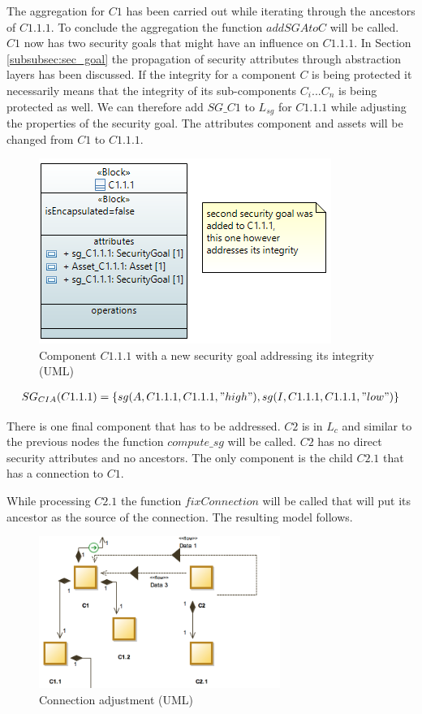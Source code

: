 The aggregation for $C1$ has been carried out while iterating through the ancestors of $C1.1.1$. To conclude the aggregation the function $addSGAtoC$ will be called. $C1$ now has two security goals that might have an influence on $C1.1.1$. In Section \ref{subsubsec:sec_goal} the propagation of security attributes through abstraction layers has been discussed. If the integrity for a component $C$ is being protected it necessarily means that the integrity of its sub-components $C_i ... C_n$ is being protected as well. We can therefore add $SG\_C1$ to $L_{sg}$ for $C1.1.1$ while adjusting the properties of the security goal. The attributes component and assets will be changed from $C1$ to $C1.1.1$.

\begin{figure}[H]
\centering
        \includegraphics[scale=0.9]{pictures/block_c111_integrity}
    \caption{Component $C1.1.1$ with a new security goal addressing its integrity (UML)}
\end{figure}

\begin{align*}
SG_{CIA}(C1.1.1) = \{sg(A,C1.1.1,C1.1.1,"high"), sg(I,C1.1.1,C1.1.1,"low")\}
\end{align*}

There is one final component that has to be addressed. $C2$ is in $L_c$ and similar to the previous nodes the function $compute\_sg$ will be called. $C2$ has no direct security attributes and no ancestors. The only component is the child $C2.1$ that has a connection to $C1$. 

While processing $C2.1$ the function $fixConnection$ will be called that will  put its ancestor as the source of the connection. The resulting model follows.

\begin{figure}[H]
\centering
\includegraphics[width=0.7\textwidth]{pictures/con_c2}
\caption{Connection adjustment (UML)}
\label{fig:con_c2}
\end{figure}

